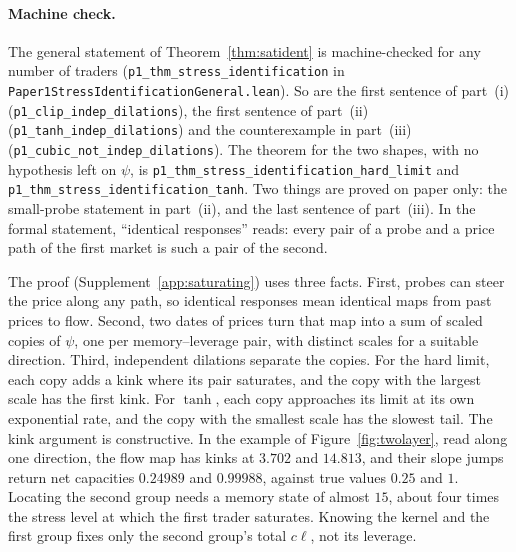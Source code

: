 \documentclass[12pt]{article}
\theoremstyle{definition}
\theoremstyle{remark}
\begin{document}
\paragraph{Machine check.} The general statement of Theorem~\ref{thm:satident} is machine-checked for any number of traders (\texttt{p1\_thm\_stress\_identification} in \nolinkurl{Paper1StressIdentificationGeneral.lean}). So are the first sentence of part~(i) (\texttt{p1\_clip\_indep\_dilations}), the first sentence of part~(ii) (\texttt{p1\_tanh\_indep\_dilations}) and the counterexample in part~(iii) (\texttt{p1\_cubic\_not\_indep\_dilations}). The theorem for the two shapes, with no hypothesis left on $\psi$, is \nolinkurl{p1_thm_stress_identification_hard_limit} and \nolinkurl{p1_thm_stress_identification_tanh}. Two things are proved on paper only: the small-probe statement in part~(ii), and the last sentence of part~(iii). In the formal statement, ``identical responses'' reads: every pair of a probe and a price path of the first market is such a pair of the second.

The proof (Supplement~\ref{app:saturating}) uses three facts. First, probes can steer the price along any path, so identical responses mean identical maps from past prices to flow. Second, two dates of prices turn that map into a sum of scaled copies of $\psi$, one per memory--leverage pair, with distinct scales for a suitable direction. Third, independent dilations separate the copies. For the hard limit, each copy adds a kink where its pair saturates, and the copy with the largest scale has the first kink. For $\tanh$, each copy approaches its limit at its own exponential rate, and the copy with the smallest scale has the slowest tail. The kink argument is constructive. In the example of Figure~\ref{fig:twolayer}, read along one direction, the flow map has kinks at $3.702$ and $14.813$, and their slope jumps return net capacities $0.24989$ and $0.99988$, against true values $0.25$ and $1$. Locating the second group needs a memory state of almost $15$, about four times the stress level at which the first trader saturates. Knowing the kernel and the first group fixes only the second group's total $c\ell$, not its leverage.
\end{document}
